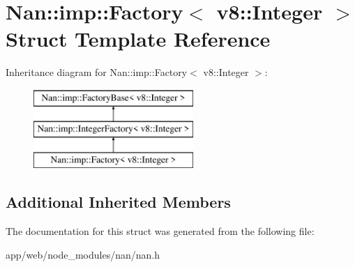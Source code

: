 \hypertarget{struct_nan_1_1imp_1_1_factory_3_01v8_1_1_integer_01_4}{}\section{Nan\+:\+:imp\+:\+:Factory$<$ v8\+:\+:Integer $>$ Struct Template Reference}
\label{struct_nan_1_1imp_1_1_factory_3_01v8_1_1_integer_01_4}
Inheritance diagram for Nan\+:\+:imp\+:\+:Factory$<$ v8\+:\+:Integer $>$\+:\begin{figure}[H]
\begin{center}
\leavevmode
\includegraphics[height=3.000000cm]{struct_nan_1_1imp_1_1_factory_3_01v8_1_1_integer_01_4}
\end{center}
\end{figure}
\subsection*{Additional Inherited Members}


The documentation for this struct was generated from the following file\+:\begin{DoxyCompactItemize}
\item 
app/web/node\+\_\+modules/nan/nan.\+h\end{DoxyCompactItemize}
